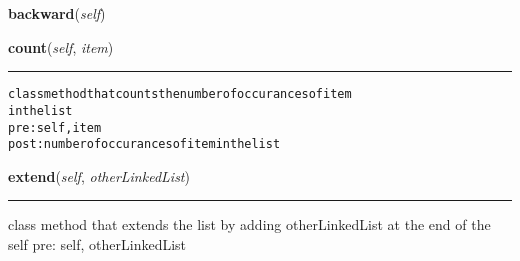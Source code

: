     \vspace{0.5ex}

\hspace{.8\funcindent}\begin{boxedminipage}{\funcwidth}

    \raggedright \textbf{backward}(\textit{self})

\setlength{\parskip}{2ex}
\setlength{\parskip}{1ex}
    \end{boxedminipage}

    \label{coinor:blimpy:LinkedList':LinkedList:count}

    \vspace{0.5ex}

\hspace{.8\funcindent}\begin{boxedminipage}{\funcwidth}

    \raggedright \textbf{count}(\textit{self}, \textit{item})

    \vspace{-1.5ex}

    \rule{\textwidth}{0.5\fboxrule}
\setlength{\parskip}{2ex}
\begin{alltt}
class method that counts the number of occurances of item
 in the list
pre: self, item
post: number of occurances of item in the list
\end{alltt}

\setlength{\parskip}{1ex}
    \end{boxedminipage}

    \label{coinor:blimpy:LinkedList':LinkedList:extend}

    \vspace{0.5ex}

\hspace{.8\funcindent}\begin{boxedminipage}{\funcwidth}

    \raggedright \textbf{extend}(\textit{self}, \textit{otherLinkedList})

    \vspace{-1.5ex}

    \rule{\textwidth}{0.5\fboxrule}
\setlength{\parskip}{2ex}
    class method that extends the list by adding otherLinkedList at the end
    of the self pre: self, otherLinkedList

\setlength{\parskip}{1ex}
    \end{boxedminipage}


